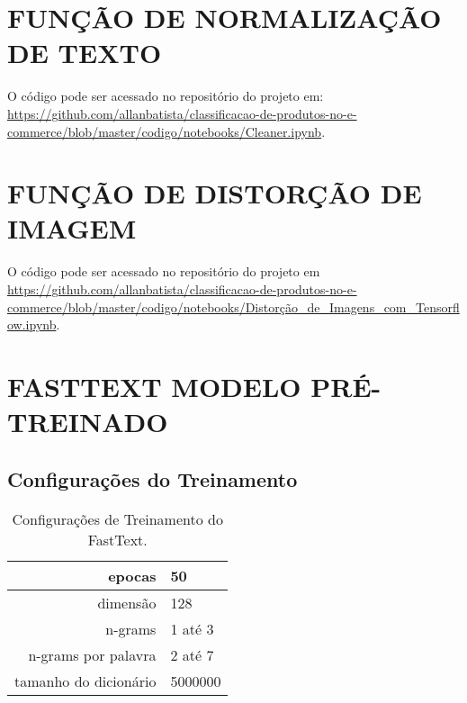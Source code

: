 \begin{apendicesenv}

\partapendices
\clearpage
\clearpage

\chapter{FUNÇÃO DE NORMALIZAÇÃO DE TEXTO}
\label{chap:funcao_normalizacao_texto}

O código pode ser acessado no repositório do projeto em:
\url{https://github.com/allanbatista/classificacao-de-produtos-no-e-commerce/blob/master/codigo/notebooks/Cleaner.ipynb}.

\clearpage
\chapter{FUNÇÃO DE DISTORÇÃO DE IMAGEM}
\label{chap:funcao_distorcao_imagem}

O código pode ser acessado no repositório do projeto em 
\url{https://github.com/allanbatista/classificacao-de-produtos-no-e-commerce/blob/master/codigo/notebooks/Distorção_de_Imagens_com_Tensorflow.ipynb}.

\chapter{FASTTEXT MODELO PRÉ-TREINADO}
\label{chap:fasttext_modelo_pretreinado}


\section{Configurações do Treinamento}

\begin{table}[htb]
    \ABNTEXfontereduzida
    \centering
    \caption[Configurações de Treinamento do FastText]{Configurações de Treinamento do FastText.}
    \begin{tabular}{|r|l|} \hline
        epocas & 50 \\ \hline
        dimensão & 128 \\ \hline
        n-grams & 1 até 3 \\ \hline
        n-grams por palavra & 2 até 7 \\ \hline
        tamanho do dicionário & 5000000 \\ \hline
    \end{tabular}
    \label{tab:fasttext_configuracores}
\end{table}


\end{apendicesenv}

